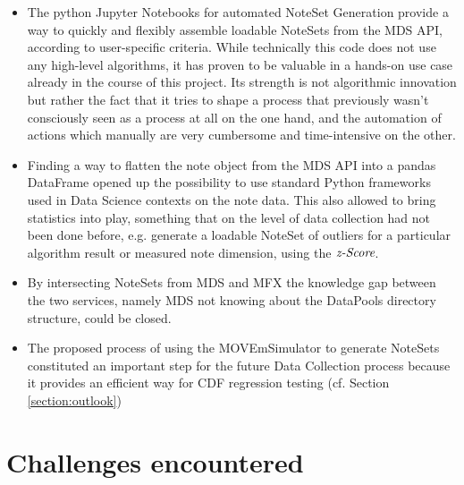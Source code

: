 \begin{itemize}
	\item The python Jupyter Notebooks for automated NoteSet Generation provide a way to quickly and flexibly assemble loadable NoteSets from the MDS API, according to user-specific criteria. While technically this code does not use any high-level algorithms, it has proven to be valuable in a hands-on use case already in the course of this project. Its strength is not algorithmic innovation but rather the fact that it tries to shape a process that previously wasn't consciously seen as a process at all on the one hand, and the automation of actions which manually are very cumbersome and time-intensive on the other.
	\item Finding a way to flatten the note object from the MDS API into a pandas DataFrame opened up the possibility to use standard Python frameworks used in Data Science contexts on the note data. This also allowed to bring statistics into play, something that on the level of data collection had not been done before, e.g. generate a loadable NoteSet of outliers for a particular algorithm result or measured note dimension, using the $\emph{z-Score}$.
	\item By intersecting NoteSets from MDS and MFX the knowledge gap between the two services, namely MDS not knowing about the DataPools directory structure, could be closed.
	\item The proposed process of using the MOVEmSimulator to generate NoteSets constituted an important step for the future Data Collection process because it provides an efficient way for CDF regression testing (cf. Section \ref{section:outlook})
\end{itemize}

\section{Challenges encountered}

